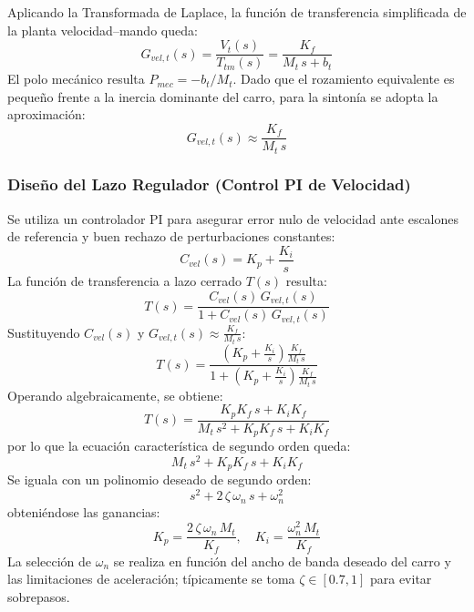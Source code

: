 \documentclass[11pt]{article}                                    %
\begin{document}
Aplicando la Transformada de Laplace, la función de transferencia simplificada de la planta velocidad--mando queda:
\begin{equation}
    G_{vel,t}(s) = \frac{V_t(s)}{T_{tm}(s)} = \frac{K_f}{M_t\,s + b_t}
\end{equation}
El polo mecánico resulta $P_{mec} = -b_t/M_t$. Dado que el rozamiento equivalente es pequeño frente a la inercia dominante del carro, para la sintonía se adopta la aproximación:
\begin{equation}
    G_{vel,t}(s) \approx \frac{K_f}{M_t\,s}
\end{equation}

\subsubsection{Diseño del Lazo Regulador (Control PI de Velocidad)}
Se utiliza un controlador PI para asegurar error nulo de velocidad ante escalones de referencia y buen rechazo de perturbaciones constantes:
\begin{equation}
    C_{vel}(s) = K_p + \frac{K_i}{s}
\end{equation}
La función de transferencia a lazo cerrado $T(s)$ resulta:
\begin{equation}
    T(s) = \frac{C_{vel}(s) \, G_{vel,t}(s)}{1 + C_{vel}(s) \, G_{vel,t}(s)}
\end{equation}
Sustituyendo $C_{vel}(s)$ y $G_{vel,t}(s) \approx \frac{K_f}{M_t\,s}$:
\begin{equation}
    T(s) =
    \frac{\left(K_p + \frac{K_i}{s}\right)\frac{K_f}{M_t\,s}}
    {1 + \left(K_p + \frac{K_i}{s}\right)\frac{K_f}{M_t\,s}}
\end{equation}
Operando algebraicamente, se obtiene:
\begin{equation}
    T(s) = \frac{K_p K_f\,s + K_i K_f}{M_t\,s^2 + K_p K_f\,s + K_i K_f}
\end{equation}
por lo que la ecuación característica de segundo orden queda:
\begin{equation}
    M_t\,s^2 + K_p K_f\,s + K_i K_f
\end{equation}
Se iguala con un polinomio deseado de segundo orden:
\begin{equation}
    s^2 + 2\,\zeta\,\omega_n\,s + \omega_n^2
\end{equation}
obteniéndose las ganancias:
\begin{equation}
    K_p = \frac{2\,\zeta\,\omega_n\,M_t}{K_f}, \quad
    K_i = \frac{\omega_n^2\,M_t}{K_f}
\end{equation}
La selección de $\omega_n$ se realiza en función del ancho de banda deseado del carro y las limitaciones de aceleración; típicamente se toma $\zeta \in [0.7,1]$ para evitar sobrepasos.
\end{document}
